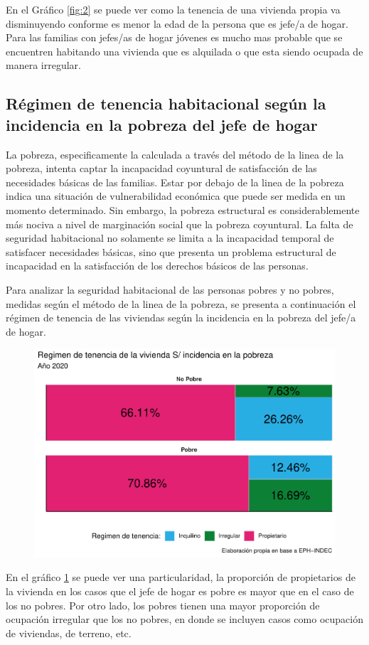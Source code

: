 \documentclass[
]{article}
\begin{document}
En el Gráfico \ref{fig:2} se puede ver como la tenencia de una vivienda propia va
disminuyendo conforme es menor la edad de la persona que es jefe/a de
hogar. Para las familias con jefes/as de hogar jóvenes es mucho mas probable que se encuentren habitando una vivienda que es alquilada o que esta siendo ocupada de manera irregular.

\hypertarget{ruxe9gimen-de-tenencia-habitacional-seguxfan-la-incidencia-en-la-pobreza-del-jefe-de-hogar}{%
\subsection{Régimen de tenencia habitacional según la incidencia en la
pobreza del jefe de
hogar}\label{ruxe9gimen-de-tenencia-habitacional-seguxfan-la-incidencia-en-la-pobreza-del-jefe-de-hogar}}

La pobreza, especificamente la calculada a través del método de la linea
de la pobreza, intenta captar la incapacidad coyuntural de satisfacción
de las necesidades básicas de las familias. Estar por debajo de la linea
de la pobreza indica una situación de vulnerabilidad económica que puede
ser medida en un momento determinado. Sin embargo, la pobreza
estructural es considerablemente más nociva a nivel de marginación
social que la pobreza coyuntural. La falta de seguridad habitacional no
solamente se limita a la incapacidad temporal de satisfacer necesidades
básicas, sino que presenta un problema estructural de incapacidad en la
satisfacción de los derechos básicos de las personas.

Para analizar la seguridad habitacional de las personas pobres y no
pobres, medidas según el método de la linea de la pobreza, se presenta a
continuación el régimen de tenencia de las viviendas según la incidencia
en la pobreza del jefe/a de hogar.

\begin{figure}[htbp!]
\includegraphics{habitacional_files/figure-latex/unnamed-chunk-10-1.pdf}
\caption{\label{fig:3}}
\end{figure}

En el gráfico \ref{fig:3} se puede ver una particularidad, la proporción de
propietarios de la vivienda en los casos que el jefe de hogar es pobre
es mayor que en el caso de los no pobres. Por otro lado, los pobres
tienen una mayor proporción de ocupación irregular que los no pobres, en
donde se incluyen casos como ocupación de viviendas, de terreno, etc.
\end{document}
